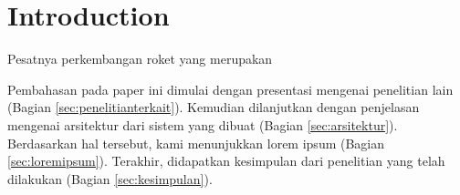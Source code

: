 \section{Introduction}
\label{sec:introduction}


Pesatnya perkembangan roket yang merupakan \lipsum[2-4]

Pembahasan pada paper ini dimulai dengan presentasi mengenai penelitian lain (Bagian \ref{sec:penelitianterkait}).
Kemudian dilanjutkan dengan penjelasan mengenai arsitektur dari sistem yang dibuat (Bagian \ref{sec:arsitektur}).
Berdasarkan hal tersebut, kami menunjukkan lorem ipsum (Bagian \ref{sec:loremipsum}).
Terakhir, didapatkan kesimpulan dari penelitian yang telah dilakukan (Bagian \ref{sec:kesimpulan}).

